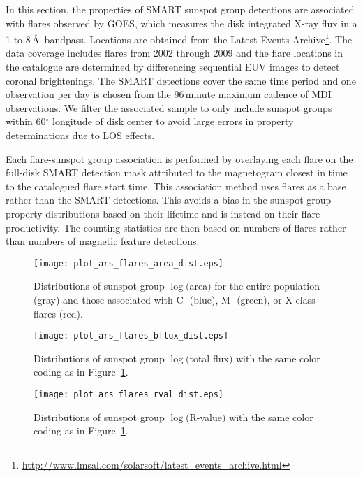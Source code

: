 {In this section, the properties of \gls{SMART} sunspot group detections are associated with flares observed by \gls{GOES}, which measures the disk integrated X-ray flux in a 1 to 8\,\AA\ bandpass. Locations are obtained from the Latest Events Archive\footnote{\url{http://www.lmsal.com/solarsoft/latest\_events\_archive.html}}. The data coverage includes flares from 2002 through 2009 and the flare locations in the catalogue are determined by differencing sequential \gls{EUV} images to detect coronal brightenings. The \gls{SMART} detections cover the same time period and one observation per day is chosen from the 96\,minute maximum cadence of \gls{MDI} observations. We filter the associated sample to only include sunspot groups within 60$^\circ$ longitude of disk center to avoid large errors in property determinations due to \gls{LOS} effects.

Each flare-sunspot group association is performed by overlaying each flare on the full-disk \gls{SMART} detection mask attributed to the magnetogram closest in time to the catalogued flare start time. This association method uses flares as a base rather than the \gls{SMART} detections. This avoids a bias in the sunspot group property distributions based on their lifetime and is instead on their flare productivity. The counting statistics are then based on numbers of flares rather than numbers of magnetic feature detections.

\begin{figure}[!t]
\centerline{\texttt{[image: plot\_ars\_flares\_area\_dist.eps]}}
\caption[Flaring AR area distributions.]{Distributions of sunspot group $\log($area$)$ for the entire population (gray) and those associated with C- (blue), M- (green), or X-class flares (red).}
\label{fig:minareaflr}
\end{figure}

\begin{figure}[!t]
\centerline{\texttt{[image: plot\_ars\_flares\_bflux\_dist.eps]}}
\caption[Flaring AR flux distributions.]{Distributions of sunspot group $\log($total flux$)$ with the same color coding as in Figure~\ref{fig:minareaflr}.}
\label{fig:minfluxflr}
\end{figure}

\begin{figure}[!t]
\centerline{\texttt{[image: plot\_ars\_flares\_rval\_dist.eps]}}
\caption[Flaring AR R-value distributions.]{Distributions of sunspot group $\log($R-value$)$ with the same color coding as in Figure~\ref{fig:minareaflr}.}
\label{fig:minrflr}
\end{figure}

}
